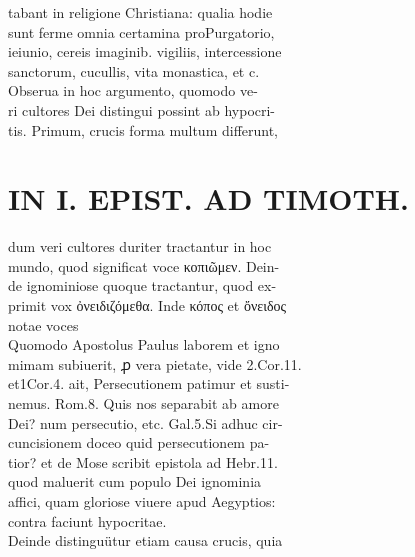 \documentclass{article}
\begin{document}
\begin{pages}
                tabant in religione Christiana: qualia hodie \\
                sunt ferme omnia certamina proPurgatorio, \\
                ieiunio, cereis imaginib. vigiliis, intercessione \\
                sanctorum, cucullis, vita monastica, et c. \\
                Obserua in hoc argumento, quomodo ve- \\
                ri cultores Dei distingui possint ab hypocri- \\
                tis. Primum, crucis forma multum differunt, \\
                
\section*{IN I. EPIST. AD TIMOTH. \\
                }
dum veri cultores duriter tractantur in hoc \\
                mundo, quod significat voce κοπιῶμεν. Dein- \\
                de ignominiose quoque tractantur, quod ex- \\
                primit vox ὀνειδιζόμεθα. Inde κόπος et ὄνειδος \\
                notae voces \\
                Quomodo Apostolus Paulus laborem et igno \\
                mimam subiuerit, ꝓ vera pietate, vide 2.Cor.11. \\
                et1Cor.4. ait, Persecutionem patimur et susti- \\
                nemus. Rom.8. Quis nos separabit ab amore \\
                Dei? num persecutio, etc. Gal.5.Si adhuc cir- \\
                cuncisionem doceo quid persecutionem pa- \\
                tior? et de Mose scribit epistola ad Hebr.11. \\
                quod maluerit cum populo Dei ignominia \\
                affici, quam gloriose viuere apud Aegyptios: \\
                contra faciunt hypocritae. \\
                Deinde distinguütur etiam causa crucis, quia \\

\end{pages}
\end{document}
